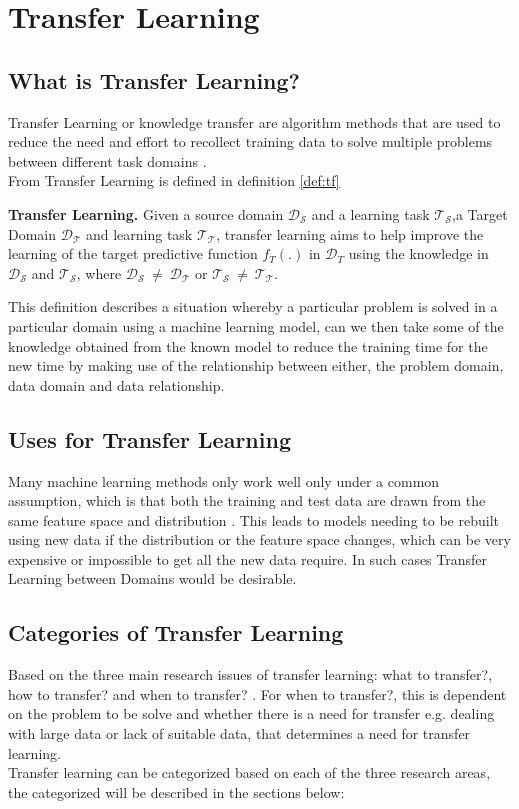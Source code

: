 \newpage
\section{Transfer Learning}
\subsection{What is Transfer Learning?}
Transfer Learning or knowledge transfer are algorithm methods that are used to reduce the need and effort to recollect training data to solve multiple problems between different task domains \cite{Pan2010}.\\
From \cite{Pan2010} Transfer Learning is defined in definition \ref{def:tf}
\begin{dft}{\textbf{Transfer Learning.}}\label{def:tf}
	Given a source domain $\mathcal{D}_{\mathcal{S}}$ and a learning task $\mathcal{T}_{\mathcal{S}}$,a Target Domain $\mathcal{D}_{\mathcal{T}}$ and learning task $\mathcal{T}_{\mathcal{T}}$, transfer learning aims to help improve the learning of the target predictive function $f_{T}(.)$ in $\mathcal{D}_{T}$  using the knowledge in $\mathcal{D}_{\mathcal{S}}$ and $\mathcal{T}_{\mathcal{S}}$, where $\mathcal{D}_{\mathcal{S}}~ \neq~ \mathcal{D}_{\mathcal{T}}$ or  $\mathcal{T}_{\mathcal{S}}~\neq~ \mathcal{T}_{\mathcal{T}}$.
\end{dft}
This definition describes a situation whereby a particular problem is solved in a particular domain using a machine learning model, can we then take some of the knowledge obtained from the known model to reduce the training time for the new time by making use of the relationship between either, the problem domain, data domain and data relationship.

\subsection{Uses for Transfer Learning}
Many machine learning methods only work well only under a common assumption, which is that both the training and test data are drawn from the same feature space and distribution \cite{Pan2010}. This leads to models needing to be rebuilt using new data if the distribution or the feature space changes, which can be very expensive or impossible to get all the new data require. In such cases Transfer Learning between Domains would be desirable.\\

\subsection{Categories of Transfer Learning}
Based on the three main research issues of transfer learning: what to transfer?, how to transfer? and when to transfer? \cite{Pan2010}.
For when to transfer?, this is dependent on the problem to be solve and whether there is a need for transfer e.g. dealing with large data or lack of suitable data, that determines a need for transfer learning.\\ 
Transfer learning can be categorized based on each of the three research areas, the categorized will be described in the sections below:

